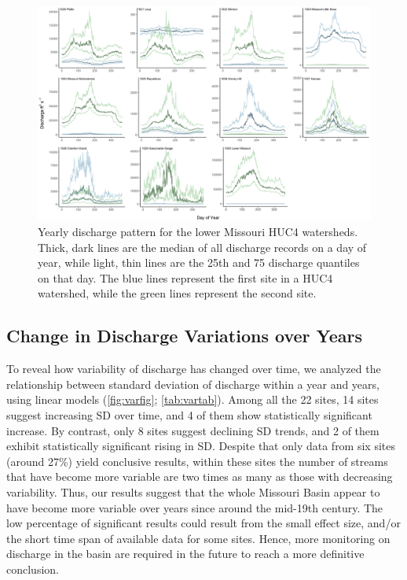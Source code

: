 \documentclass[12pt,]{article}
\makeatletter
\def\maxwidth{\ifdim\Gin@nat@width>\linewidth\linewidth\else\Gin@nat@width\fi}
\makeatother
\begin{document}
\begin{figure}[H]
\includegraphics[width=\maxwidth]{../Figures/discharge} \caption{\label{fig:dispattern}Yearly discharge pattern for the lower Missouri HUC4 watersheds. Thick, dark lines are the median of all discharge records on a day of year, while light, thin lines are the 25th and 75 discharge quantiles on that day. The blue lines represent the first site in a HUC4 watershed, while the green lines represent the second site.}\label{fig:dispattern}
\end{figure}

\hypertarget{change-in-discharge-variations-over-years}{%
\subsection{Change in Discharge Variations over
Years}\label{change-in-discharge-variations-over-years}}

To reveal how variability of discharge has changed over time, we
analyzed the relationship between standard deviation of discharge within
a year and years, using linear models (\autoref{fig:varfig};
\autoref{tab:vartab}). Among all the 22 sites, 14 sites suggest
increasing SD over time, and 4 of them show statistically significant
increase. By contrast, only 8 sites suggest declining SD trends, and 2
of them exhibit statistically significant rising in SD. Despite that
only data from six sites (around 27\%) yield conclusive results, within
these sites the number of streams that have become more variable are two
times as many as those with decreasing variability. Thus, our results
suggest that the whole Missouri Basin appear to have become more
variable over years since around the mid-19th century. The low
percentage of significant results could result from the small effect
size, and/or the short time span of available data for some sites.
Hence, more monitoring on discharge in the basin are required in the
future to reach a more definitive conclusion.
\end{document}
